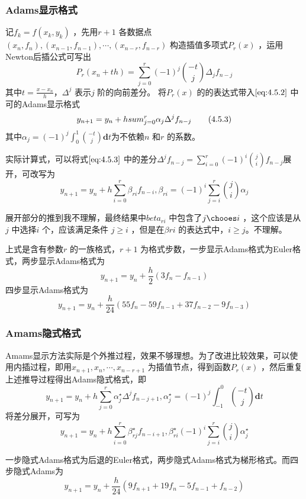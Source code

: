 \documentclass[a4paper]{article}
\begin{document}
\subsubsection{Adams显示格式}
记$f_k = f(x_{k}, y_{k})$ ，先用$r+1$ 各数据点$(x_{n}, f_n), (x_{n-1}, f_{n-1}), \cdots, (x_{n-r}, f_{n-r})$ 构造插值多项式$P_r(x)$ ，运用Newton后插公式可写出
\[
	P_r(x_{n} + th) = \sum_{j=0}^{r} (-1)^{j}{ -t \choose j} \Delta_j f_{n-j}
\] 
其中$t = \frac{x - x_{n}}{h}$，$\Delta^{j}$ 表示$j$ 阶的向前差分。
将$P_r(x)$ 的的表达式带入$\ref{eq:4.5.2}$ 中可的Adams显示格式
\[
	y_{n+1} = y_{n} + h \\sum_{j=0}^{r} \alpha_j \Delta^{j} f_{n-j} \tag{4.5.3} \label{eq:4.5.3} 
\] 
其中$\alpha_j = (-1)^{j} \int_{0}^{1} {-t \choose j} \mathbf{d} t $为不依赖$n$ 和$r$ 的系数。

实际计算式，可以将式$\ref{eq:4.5.3}$ 中的差分$\Delta^{j} f_{n-j} = \sum_{i=0}^{r} (-1)^{i} {j \choose i} f_{n-j}$展开，可改写为
\[
	y_{n+1} = y_{n} + h \sum_{i=0}^{r} \beta_{ri} f_{n-i}, \beta_{ri} = (-1)^{i} \sum_{j=i}^{r} {j \choose i} \alpha_j \tag{4.5.4} \label{eq:4.5.4} 
\] 

展开部分的推到我不理解，最终结果中$beta_{ri}$ 中包含了${j \chooes i}$ ，这个应该是从$j$ 中选择$i$ 个，应该满足条件 $j \ge i$ ，但是在$\beta{ri}$ 的表达式中，$i \ge j$。不理解。

上式是含有参数$r$ 的一族格式，$r+1$ 为格式步数，一步显示Adams格式为Euler格式，两步显示Adams格式为
\[
	y_{n+1} = y_{n} + \frac{h}{2} (3 f_n - f_{n-1}) \tag{4.5.5} \label{eq:4.5.5} 
\] 
四步显示Adams格式为
\[
	y_{n+1} = y_{n} + \frac{h}{24} (55 f_n - 59 f_{n-1} + 37 f_{n-2} - 9 f_{n-3})	\tag{4.5.6} \label{eq:4.5.6} 
\] 
\subsubsection{Amams隐式格式}
Amams显示方法实际是个外推过程，效果不够理想。为了改进比较效果，可以使用内插过程，即用$x_{n+1}, x_{n}, \cdots, x_{n-r+1}$ 为插值节点，得到函数$P_r(x)$ ，然后重复上述推导过程得出Adams隐式格式，即
\[
	y_{n+1} = y_{n} + h \sum_{j=0}^{r} \alpha^{\star}_j \Delta^{j} f_{n-j+1}, \alpha^{\star}_j = (-1)^{j} \int_{-1}^{0} {-t \choose j} \mathbf{d} t \tag{4.5.7} \label{eq:4.5.7} 
\] 
将差分展开，可写为
\[
	y_{n+1} = y_{n} + h \sum_{i=0}^{r} \beta_{rj}^{\star} f_{n-i+1}, \beta_{ri}^{\star} (-1)^{i} \sum_{j=i}^{r} {j \choose i} \alpha_j^{\star} \tag{4.5.8} \label{eq:4.5.8} 
\] 

一步隐式Adams格式为后退的Euler格式，两步隐式Adams格式为梯形格式。而四步隐式Adams为
\[
	y_{n+1} = y_{n} + \frac{h}{24} (9 f_{n+1} + 19 f_n - 5 f_{n-1} + f_{n-2}) \tag{4.5.9} \label{eq:4.5.9} 
\] 
\end{document}
